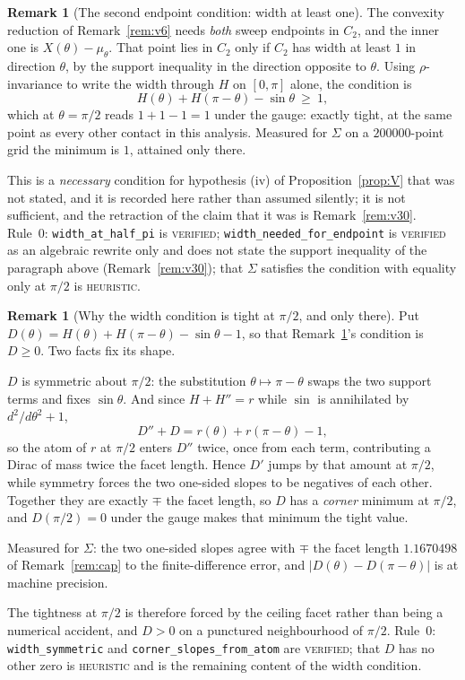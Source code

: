 \documentclass[11pt]{article}
\theoremstyle{definition}
\newtheorem{remark}[theorem]{Remark}
\newcommand{\Sig}{\Sigma}
\begin{document}
\begin{remark}[The second endpoint condition: width at least one]\label{rem:v14}
The convexity reduction of Remark~\ref{rem:v6} needs \emph{both} sweep endpoints in $C_2$,
and the inner one is $X(\theta)-\mu_\theta$. That point lies in $C_2$ only if $C_2$ has width
at least $1$ in direction $\theta$, by the support inequality in the direction opposite to
$\theta$. Using $\rho$-invariance to write the width through $H$ on $[0,\pi]$ alone, the
condition is
\[
  H(\theta)+H(\pi-\theta)-\sin\theta\ \ge\ 1 ,
\]
which at $\theta=\pi/2$ reads $1+1-1=1$ under the gauge: exactly tight, at the same point as
every other contact in this analysis. Measured for $\Sig$ on a $200000$-point grid the
minimum is $1$, attained only there.

This is a \emph{necessary} condition for hypothesis (iv) of Proposition~\ref{prop:V} that was
not stated, and it is recorded here rather than assumed silently; it is not sufficient, and
the retraction of the claim that it was is Remark~\ref{rem:v30}. Rule~0:
\verb|width_at_half_pi| is \textsc{verified}; \verb|width_needed_for_endpoint| is
\textsc{verified} as an algebraic rewrite only and does not state the support inequality of
the paragraph above (Remark~\ref{rem:v30}); that $\Sig$ satisfies the condition
with equality only at $\pi/2$ is \textsc{heuristic}.
\end{remark}

\begin{remark}[Why the width condition is tight at $\pi/2$, and only there]\label{rem:v15}
Put $D(\theta)=H(\theta)+H(\pi-\theta)-\sin\theta-1$, so that Remark~\ref{rem:v14}'s condition
is $D\ge0$. Two facts fix its shape.

$D$ is symmetric about $\pi/2$: the substitution $\theta\mapsto\pi-\theta$ swaps the two
support terms and fixes $\sin\theta$. And since $H+H''=r$ while $\sin$ is annihilated by
$d^2/d\theta^2+1$,
\[
  D''+D=r(\theta)+r(\pi-\theta)-1 ,
\]
so the atom of $r$ at $\pi/2$ enters $D''$ twice, once from each term, contributing a Dirac
of mass twice the facet length. Hence $D'$ jumps by that amount at $\pi/2$, while symmetry
forces the two one-sided slopes to be negatives of each other. Together they are exactly
$\mp$ the facet length, so $D$ has a \emph{corner} minimum at $\pi/2$, and $D(\pi/2)=0$ under
the gauge makes that minimum the tight value.

Measured for $\Sig$: the two one-sided slopes agree with $\mp$ the facet length
$1.1670498$ of Remark~\ref{rem:cap} to the finite-difference error, and
$|D(\theta)-D(\pi-\theta)|$ is at machine precision.

The tightness at $\pi/2$ is therefore forced by the ceiling facet rather than being a
numerical accident, and $D>0$ on a punctured neighbourhood of $\pi/2$. Rule~0:
\verb|width_symmetric| and \verb|corner_slopes_from_atom| are \textsc{verified}; that $D$ has
no other zero is \textsc{heuristic} and is the remaining content of the width condition.
\end{remark}
\end{document}
